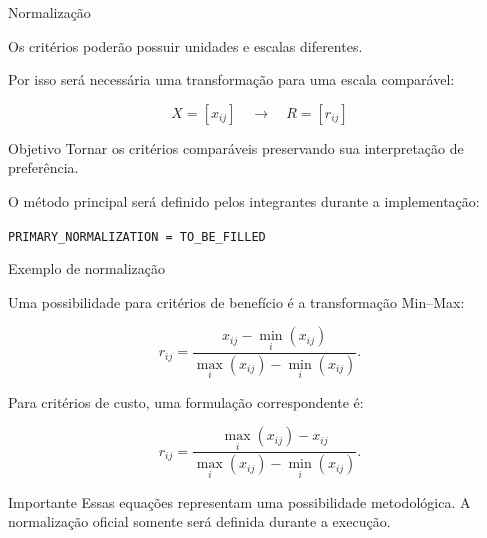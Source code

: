 \begin{frame}{Normalização}

    Os critérios poderão possuir unidades e escalas diferentes.

    \vspace{0.3cm}

    Por isso será necessária uma transformação para uma escala
    comparável:

    \[
    X=[x_{ij}]
    \quad\longrightarrow\quad
    R=[r_{ij}]
    \]

    \vspace{0.3cm}

    \begin{block}{Objetivo}
        Tornar os critérios comparáveis preservando sua interpretação
        de preferência.
    \end{block}

    \vspace{0.3cm}

    O método principal será definido pelos integrantes durante a
    implementação:

    \begin{center}
        \texttt{PRIMARY\_NORMALIZATION = TO\_BE\_FILLED}
    \end{center}

\end{frame}



\begin{frame}{Exemplo de normalização}

    Uma possibilidade para critérios de benefício é a transformação
    Min--Max:

    \[
    r_{ij}
    =
    \frac{x_{ij}-\min_i(x_{ij})}
         {\max_i(x_{ij})-\min_i(x_{ij})}.
    \]

    Para critérios de custo, uma formulação correspondente é:

    \[
    r_{ij}
    =
    \frac{\max_i(x_{ij})-x_{ij}}
         {\max_i(x_{ij})-\min_i(x_{ij})}.
    \]

    \vspace{0.3cm}

    \begin{alertblock}{Importante}
        Essas equações representam uma possibilidade metodológica.
        A normalização oficial somente será definida durante a execução.
    \end{alertblock}

\end{frame}


